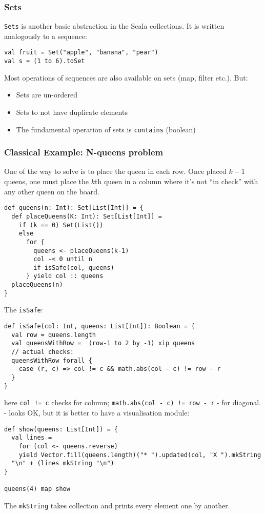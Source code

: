 \documentclass{scrartcl}
\newcommand{\term}[1]{\verb~#1~} %
\begin{document}
\subsubsection{Sets}
\label{sec:FunctionsAsObjects}

\term{Sets} is another basic abstraction in the Scala collections. It is written
analogously to a sequence:
\begin{lstlisting}
val fruit = Set("apple", "banana", "pear")
val s = (1 to 6).toSet
\end{lstlisting}
Most operations of sequences are also available on sets (map, filter etc.). But:
\begin{itemize}
\item Sets are un-ordered
\item Sets to not have duplicate elements
\item The fundamental operation of sets is \lstinline|contains| (boolean)
\end{itemize}

\subsubsection{Classical Example: N-queens problem}
\label{sec:NQueensProblem}

One of the way to solve is to place the queen in each row. Once placed $k-1$
queens, one must place the $k$th queen in a column where it's not ``in check''
with any other queen on the board.
\begin{lstlisting}
def queens(n: Int): Set[List[Int]] = {
  def placeQueens(K: Int): Set[List[Int]] = 
    if (k == 0) Set(List())
    else 
      for {
        queens <- placeQueens(k-1)
        col -< 0 until n
        if isSafe(col, queens)
      } yield col :: queens
  placeQueens(n)
}
\end{lstlisting}
The \lstinline|isSafe|:
\begin{lstlisting}
def isSafe(col: Int, queens: List[Int]): Boolean = {
  val row = queens.length
  val queensWithRow =  (row-1 to 2 by -1) xip queens
  // actual checks:
  queensWithRow forall {
    case (r, c) => col != c && math.abs(col - c) != row - r
  }
}
\end{lstlisting}

here \lstinline|col != c| checks for column;
\lstinline|math.abs(col - c) != row - r| - for diagonal.
- looks OK, but it is better to have a visualisation module:
\begin{lstlisting}
def show(queens: List[Int]) = {
  val lines = 
    for (col <- queens.reverse)
    yield Vector.fill(queens.length)("* ").updated(col, "X ").mkString
  "\n" + (lines mkString "\n")
}

queens(4) map show
\end{lstlisting}
The \lstinline|mkString| takes collection and prints every element one by
another. 
\end{document}
